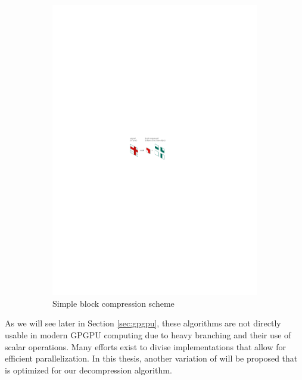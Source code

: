 \begin{figure}
\begin{subfigure}{.33\textwidth}
  \includegraphics[scale=1]{figures/block_simple.pdf}
  \caption{Simple block compression scheme}
  \label{fig:block_bitmap}
\end{subfigure}
\caption{}
\label{fig:intro}
\end{figure}

As we will see later in Section \ref{sec:gpgpu}, these algorithms are not directly usable in modern GPGPU computing due to heavy branching and their use of scalar operations. Many efforts exist to divise implementations that allow for efficient parallelization. In this thesis, another variation of \cite{amanatideswoo87} will be proposed that is optimized for our decompression algorithm.
%
